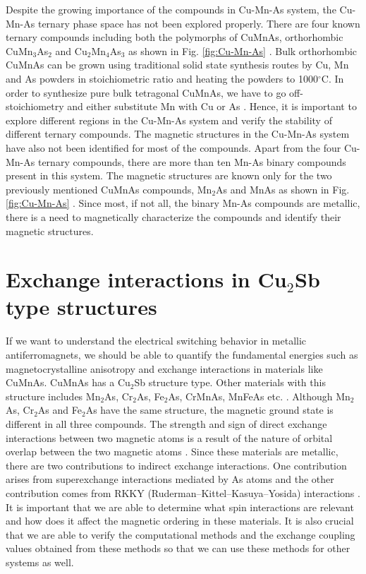 \documentclass[10pt,doublespacing,edeposit]{uiucthesis2020}
\begin{document}
\begin{mainmatter}
Despite the growing importance of the compounds in Cu-Mn-As system, the Cu-Mn-As ternary phase space has not been explored properly. There are four known ternary compounds including both the polymorphs of CuMnAs, orthorhombic CuMn$_3$As$_2$ and Cu$_2$Mn$_4$As$_3$ as shown in Fig. \ref{fig:Cu-Mn-As} \cite{Nateprov2011,MacA2012,Wadley2013,Uhlirova2015}. Bulk orthorhombic CuMnAs can be grown using traditional solid state synthesis routes by Cu, Mn and As powders in stoichiometric ratio and heating the powders to 1000$^\circ$C. In order to synthesize pure bulk tetragonal CuMnAs, we have to go off-stoichiometry and either substitute Mn with Cu or As \cite{Uhlirova2015}. Hence, it is important to explore different regions in the Cu-Mn-As system and verify the stability of different ternary compounds. The magnetic structures in the Cu-Mn-As system have also not been identified for most of the compounds. Apart from the four Cu-Mn-As ternary compounds, there are more than ten Mn-As binary compounds present in this system. The magnetic structures are known only for the two previously mentioned CuMnAs compounds, Mn$_2$As and MnAs as shown in Fig. \ref{fig:Cu-Mn-As} \cite{MacA2012,Wadley2013,Hills2015,Wadley2015,Austin1962,Bacon1955}. Since most, if not all, the binary Mn-As compounds are metallic, there is a need to magnetically characterize the compounds and identify their magnetic structures.

\section{Exchange interactions in Cu$_2$Sb type structures}

If we want to understand the electrical switching behavior in metallic antiferromagnets, we should be able to quantify the fundamental energies such as magnetocrystalline anisotropy and exchange interactions in materials like CuMnAs. CuMnAs has a Cu$_2$Sb structure type. Other materials with this structure includes Mn$_2$As, Cr$_2$As, Fe$_2$As, CrMnAs, MnFeAs etc. \cite{Lutz-Kappelman2018,Zhang2013,Zhang2015}. Although Mn$_2$As, Cr$_2$As and Fe$_2$As have the same structure, the magnetic ground state is different in all three compounds. The strength and sign of direct exchange interactions between two magnetic atoms is a result of the nature of orbital overlap between the two magnetic atoms \cite{Zhang2013}. Since these materials are metallic, there are two contributions to indirect exchange interactions. One contribution arises from superexchange interactions mediated by As atoms and the other contribution comes from RKKY (Ruderman–Kittel–Kasuya–Yosida) interactions \cite{Zhang2015}. It is important that we are able to determine what spin interactions are relevant and how does it affect the magnetic ordering in these materials. It is also crucial that we are able to verify the computational methods and the exchange coupling values obtained from these methods so that we can use these methods for other systems as well.


\end{mainmatter}
\end{document}
